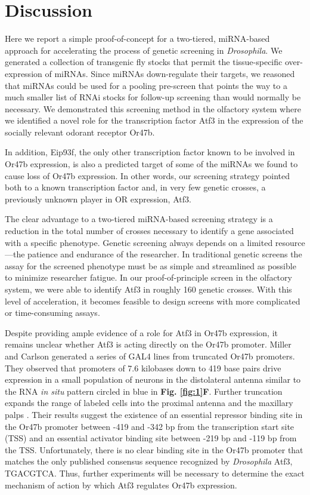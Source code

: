 \section*{Discussion}

Here we report a simple proof-of-concept for a two-tiered, miRNA-based approach for accelerating the process of genetic screening in \emph{Drosophila}.
We generated a collection of transgenic fly stocks that permit the tissue-specific over-expression of miRNAs.
Since miRNAs down-regulate their targets, we reasoned that miRNAs could be used for a pooling pre-screen that points the way to a much smaller list of RNAi stocks for follow-up screening than would normally be necessary.
We demonstrated this screening method in the olfactory system where we identified a novel role for the transcription factor Atf3 in the expression of the socially relevant odorant receptor Or47b.

In addition, Eip93f, the only other transcription factor known to be involved in Or47b expression, is also a predicted target of some of the miRNAs we found to cause loss of Or47b expression.
In other words, our screening strategy pointed both to a known transcription factor and, in very few genetic crosses, a previously unknown player in OR expression, Atf3.

The clear advantage to a two-tiered miRNA-based screening strategy is a reduction in the total number of crosses necessary to identify a gene associated with a specific phenotype.
Genetic screening always depends on a limited resource---the patience and endurance of the researcher.
In traditional genetic screens the assay for the screened phenotype must be as simple and streamlined as possible to minimize researcher fatigue.
In our proof-of-principle screen in the olfactory system, we were able to identify Atf3 in roughly 160 genetic crosses.
With this level of acceleration, it becomes feasible to design screens with more complicated or time-consuming assays.

Despite providing ample evidence of a role for Atf3 in Or47b expression, it remains unclear whether Atf3 is acting directly on the Or47b promoter.
Miller and Carlson generated a series of GAL4 lines from truncated Or47b promoters.
They observed that promoters of 7.6 kilobases down to 419 base pairs drive expression in a small population of neurons in the distolateral antenna similar to the RNA \emph{in situ} pattern circled in blue in \textbf{Fig. \ref{fig:1}F}.
Further truncation expands the range of labeled cells into the proximal antenna and the maxillary palps \cite{Miller_Carlson_2010}.
Their results suggest the existence of an essential repressor binding site in the Or47b promoter between -419 and -342 bp from the transcription start site (TSS) and an essential activator binding site between -219 bp and -119 bp from the TSS.
Unfortunately, there is no clear binding site in the Or47b promoter that matches the only published \cite{a_Bohmann_Jindra_Uhlirova_2009} consensus sequence recognized by \emph{Drosophila} Atf3, TGACGTCA.
Thus, further experiments will be necessary to determine the exact mechanism of action by which Atf3 regulates Or47b expression.

